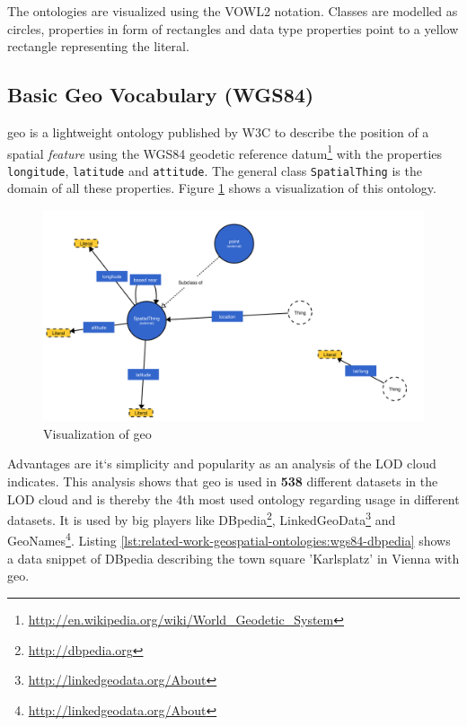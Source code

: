 \documentclass[draft,final]{vutinfth} %
\begin{document}
The ontologies are visualized using the VOWL2 notation\cite{lohmann_vowl_2014}. Classes are modelled as circles, properties in form of rectangles and data type properties point to a yellow rectangle representing the literal.

\subsection{Basic Geo Vocabulary (WGS84)}
\label{related-work-geospatial-ontologies-wgs84}

\gls{geo}\cite{brickley_basic_2003} is a lightweight ontology published by W3C to describe the position of a spatial \textit{feature} using the WGS84 geodetic reference datum\footnote{\url{http://en.wikipedia.org/wiki/World_Geodetic_System}} with the properties \texttt{longitude}, \texttt{latitude} and \texttt{attitude}. The general class \texttt{SpatialThing} is the domain of all these properties. Figure \ref{fig:related-work-geospatial-ontologies:wgs84} shows a visualization of this ontology.

\begin{figure}[H]
    \centering    
    \includegraphics[width=\columnwidth]{graphics/vocabularies/wgs84.png}
    \caption{Visualization of \gls{geo}}
    \label{fig:related-work-geospatial-ontologies:wgs84}
\end{figure}

Advantages are it`s simplicity and popularity as an analysis of the LOD cloud\cite{research_group:_akws_lodstats_????} indicates. This analysis shows that \gls{geo} is used in \textbf{538} different datasets in the LOD cloud and is thereby the 4th most used ontology regarding usage in different datasets. It is used by big players like DBpedia\footnote{\url{http://dbpedia.org}}, LinkedGeoData\footnote{\url{http://linkedgeodata.org/About}} and GeoNames\footnote{\url{http://linkedgeodata.org/About}}. 
Listing \ref{lst:related-work-geospatial-ontologies:wgs84-dbpedia} shows a data snippet of DBpedia describing the town square 'Karlsplatz' in Vienna with \gls{geo}.
\end{document}
